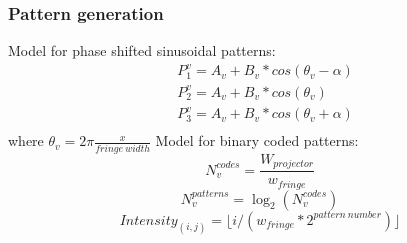 \documentclass[9pt]{beamer}
\begin{document}
\begin{frame}
\frametitle{Pattern generation}
Model for phase shifted sinusoidal patterns:
\begin{equation}
\begin{aligned}
& P_1^v=A_v+B_v*cos(\theta_v-\alpha) \\
& P_2^v=A_v+B_v*cos(\theta_v) \\
& P_3^v=A_v+B_v*cos(\theta_v+\alpha) \\
\end{aligned}
\end{equation}
where $\theta_v=2\pi\frac{x}{fringe\ width}$\newline
\newline Model for binary coded patterns:
\begin{equation}
N_{v}^{codes}=\frac{W_{projector}}{w_{fringe}} 
\end{equation}
\begin{equation}
N_{v}^{patterns}=\log_2(N_v^{codes})
\end{equation}
\begin{equation}
Intensity_{(i,j)}=\lfloor i/{(w_{fringe}*2^{pattern\ number})} \rfloor
\end{equation}    


\end{frame}
\end{document}
